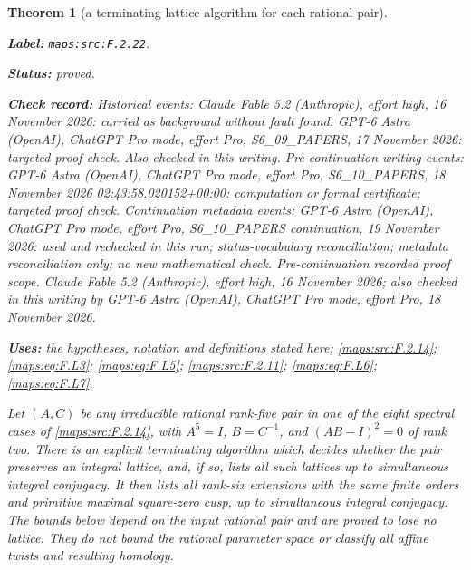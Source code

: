 \documentclass[11pt,a4paper]{article}
\newtheorem{theorem}{Theorem}[section]
\theoremstyle{definition}
\newcommand{\StatementRecord}[4]{\par\smallskip\begingroup\upshape\raggedright\noindent\textbf{Label:} \nolinkurl{#1}.\par\noindent\textbf{Status:} #2.\par\noindent\textbf{Check record:} #3.\par\noindent\textbf{Uses:} #4.\par\endgroup\smallskip}
\begin{document}
\begin{theorem}[a terminating lattice algorithm for each rational pair]\label{maps:src:F.2.22}
\StatementRecord{maps:src:F.2.22}{proved}{Historical events: Claude Fable 5.2 (Anthropic), effort high, 16 November 2026: carried as background without fault found. GPT-6 Astra (OpenAI), ChatGPT Pro mode, effort Pro, S6\_09\_PAPERS, 17 November 2026: targeted proof check. Also checked in this writing. Pre-continuation writing events: GPT-6 Astra (OpenAI), ChatGPT Pro mode, effort Pro, S6\_10\_PAPERS, 18 November 2026 02:43:58.020152+00:00: computation or formal certificate; targeted proof check. Continuation metadata events: GPT-6 Astra (OpenAI), ChatGPT Pro mode, effort Pro, S6\_10\_PAPERS continuation, 19 November 2026: used and rechecked in this run; status-vocabulary reconciliation; metadata reconciliation only; no new mathematical check. \emph{Pre-continuation recorded proof scope.} Claude Fable 5.2 (Anthropic), effort high, 16 November 2026; also checked in this writing by GPT-6 Astra (OpenAI), ChatGPT Pro mode, effort Pro, 18 November 2026}{the hypotheses, notation and definitions stated here; \cref{maps:src:F.2.14}; \cref{maps:eq:F.L3}; \cref{maps:eq:F.L5}; \cref{maps:src:F.2.11}; \cref{maps:eq:F.L6}; \cref{maps:eq:F.L7}}


Let $(A,C)$ be any irreducible rational rank-five pair in
one of the eight spectral cases of \ref{maps:src:F.2.14}, with
$A^5=I$, $B=C^{-1}$, and $(AB-I)^2=0$ of rank two.
There is an explicit terminating algorithm which decides
whether the pair preserves an integral lattice, and, if so,
lists all such lattices up to simultaneous integral conjugacy.
It then lists all rank-six extensions with the same finite
orders and primitive maximal square-zero cusp, up to
simultaneous integral conjugacy.  The bounds below depend
on the input rational pair and are proved to lose no lattice.
They do not bound the rational parameter space or classify
all affine twists and resulting homology.

\end{theorem}
\end{document}
